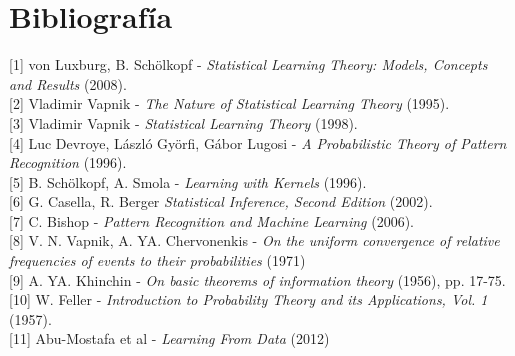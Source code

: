 \documentclass{report}
\begin{document}
\chapter*{Bibliografía}

[1] von Luxburg, B. Schölkopf - \textit{Statistical Learning Theory: Models, Concepts and Results} (2008). \\

[2] Vladimir Vapnik - \textit{The Nature of Statistical Learning Theory} (1995). \\

[3] Vladimir Vapnik  - \textit{Statistical Learning Theory} (1998). \\

[4] Luc Devroye, László Györfi, Gábor Lugosi - \textit{A Probabilistic Theory of Pattern Recognition} (1996). \\

[5] B. Schölkopf, A. Smola - \textit{Learning with Kernels} (1996). \\

[6] G. Casella, R. Berger \textit{Statistical Inference, Second Edition} (2002). \\

[7] C. Bishop - \textit{Pattern Recognition and Machine Learning} (2006). \\

[8] V. N. Vapnik, A. YA. Chervonenkis - \textit{On the uniform convergence of relative frequencies of events to their probabilities} (1971)\\

[9] A. YA. Khinchin -  \textit{On basic theorems of information theory} (1956), pp. 17-75.\\

[10] W. Feller - \textit{Introduction to Probability Theory and its Applications, Vol. 1}  (1957).\\

[11] Abu-Mostafa et al - \textit{Learning From Data} (2012)
\end{document}
